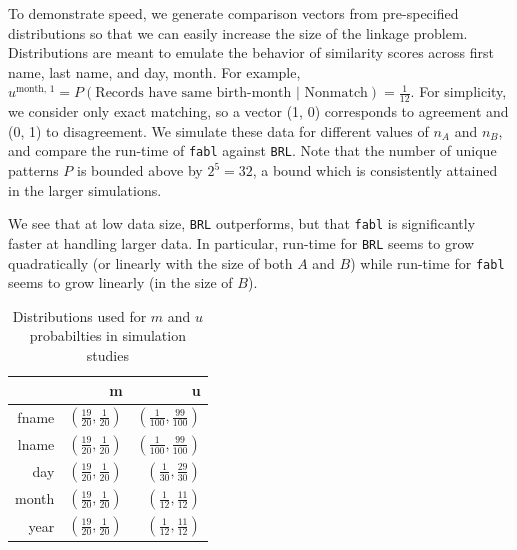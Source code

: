 \documentclass[12pt,letterpaper]{article}
\newcommand{\1}[1]{\mathbb{I}\!\left[#1\right]} %
\begin{document}
To demonstrate speed, we generate comparison vectors from pre-specified
distributions so that we can easily increase the size of the linkage
problem. Distributions are meant to emulate the behavior of similarity
scores across first name, last name, and day, month. For example, $u^{\text{month, 1}} = P(\text{Records have same birth-month | Nonmatch}) = \frac{1}{12}$. For simplicity, we
consider only exact matching, so a vector (1, 0) corresponds to
agreement and (0, 1) to disagreement. We simulate these data for
different values of \(n_A\) and \(n_B\), and compare the run-time of
\texttt{fabl} against \texttt{BRL}. Note that the number of unique
patterns \(P\) is bounded above by \(2^5 = 32\), a bound which is
consistently attained in the larger simulations.

We see that at low data size, \texttt{BRL} outperforms, but that
\texttt{fabl} is significantly faster at handling larger data. In
particular, run-time for \texttt{BRL} seems to grow quadratically (or
linearly with the size of both \(A\) and \(B\)) while run-time for
\texttt{fabl} seems to grow linearly (in the size of \(B\)).

\begin{table}[t]
	\centering
	\begin{tabular}{rrr}
		\hline
		& m & u \\ 
		\hline
		fname & $\left(\frac{19}{20}, \frac{1}{20}\right)$ & $\left(\frac{1}{100}, \frac{99}{100}\right)$ \\ 
		lname & $\left(\frac{19}{20}, \frac{1}{20}\right)$ & $\left(\frac{1}{100}, \frac{99}{100}\right)$ \\ 
		day & $\left(\frac{19}{20}, \frac{1}{20}\right)$ & $\left(\frac{1}{30}, \frac{29}{30}\right)$ \\ 
		month & $\left(\frac{19}{20}, \frac{1}{20}\right)$ & $\left(\frac{1}{12}, \frac{11}{12}\right)$ \\ 
		year & $\left(\frac{19}{20}, \frac{1}{20}\right)$ & $\left(\frac{1}{12}, \frac{11}{12}\right)$ \\ 
		\hline
	\end{tabular}
\caption{Distributions used for $m$ and $u$ probabilties in simulation studies}\label{fig:distributions}
\end{table}
\end{document}
